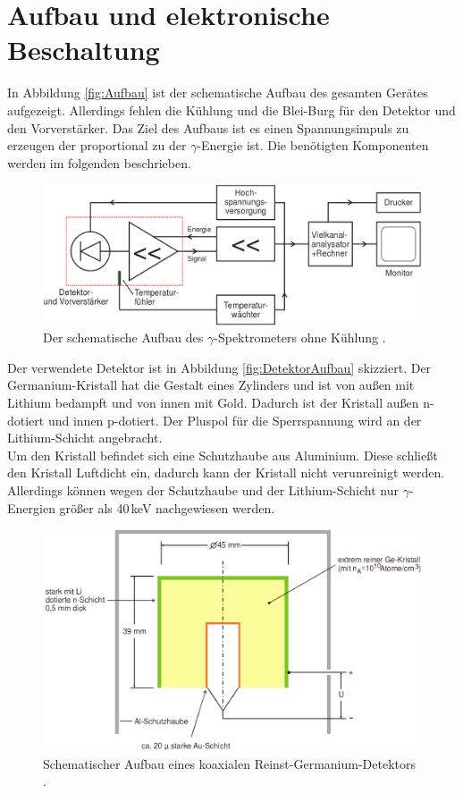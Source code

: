 \section{Aufbau und elektronische Beschaltung}
In Abbildung \eqref{fig:Aufbau} ist der schematische Aufbau des gesamten Gerätes aufgezeigt. Allerdings fehlen die Kühlung und die Blei-Burg für den Detektor und den Vorverstärker. Das Ziel des Aufbaus ist es einen Spannungsimpuls zu erzeugen der proportional zu der $\gamma$-Energie ist. Die benötigten Komponenten werden im folgenden beschrieben.

\begin{figure}
  \centering
  \includegraphics[width=\linewidth]{Bilder/Aufbau.png}
  \caption{Der schematische Aufbau des $\gamma$-Spektrometers ohne Kühlung \cite{V18}.}
  \label{fig:Aufbau}
\end{figure}

Der verwendete Detektor ist in Abbildung \eqref{fig:DetektorAufbau} skizziert. Der Germanium-Kristall hat die Gestalt eines Zylinders und ist von außen mit Lithium bedampft und von innen mit Gold. Dadurch ist der Kristall außen n-dotiert und innen p-dotiert. Der Pluspol für die Sperrspannung wird an der Lithium-Schicht angebracht. \\
Um den Kristall befindet sich eine Schutzhaube aus Aluminium. Diese schließt den Kristall Luftdicht ein, dadurch kann der Kristall nicht verunreinigt werden. Allerdings können wegen der Schutzhaube und der Lithium-Schicht nur $\gamma$-Energien größer als 40\,keV nachgewiesen werden.

\begin{figure}
  \centering
  \includegraphics[width=\linewidth]{Bilder/Germanium-Detektor.png}
  \caption{Schematischer Aufbau eines koaxialen Reinst-Germanium-Detektors \cite{V18}.}
  \label{fig:DetektorAufbau}
\end{figure}

